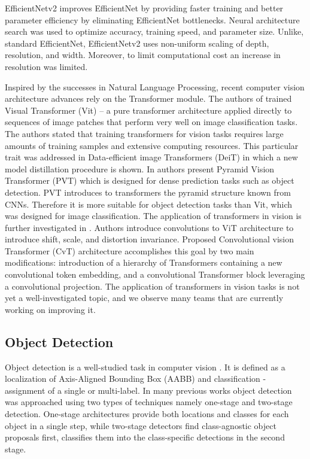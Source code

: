 \documentclass{article}
\begin{document}
EfficientNetv2 \cite{tan2021efficientnetv2} improves EfficientNet by providing faster training and better parameter efficiency by eliminating EfficientNet bottlenecks. Neural architecture search was used to optimize accuracy, training speed, and parameter size. Unlike, standard EfficientNet, EfficientNetv2 uses non-uniform scaling of depth, resolution, and width. Moreover, to limit computational cost an increase in resolution was limited.


Inspired by the successes in Natural Language Processing, recent computer vision architecture advances rely on the Transformer module. The authors of \cite{dosovitskiy2020image} trained Visual Transformer (Vit) --  a pure transformer architecture applied directly to sequences of image patches that perform very well on image classification tasks.
The authors stated that training transformers for vision tasks requires large amounts of training samples and extensive computing resources.
This particular trait was addressed in Data-efficient image Transformers
(DeiT) \cite{touvron2020training} in which a new model distillation procedure is shown.
In \cite{wang2021pyramid} authors present Pyramid Vision Transformer (PVT) which is designed for dense prediction tasks such as object detection.
PVT introduces to transformers the pyramid structure known from CNNs.
Therefore it is more suitable for object detection tasks than Vit, which was designed for image classification.
The application of transformers in vision is further investigated in \cite{wu2021cvt}.
Authors introduce convolutions to ViT architecture to introduce shift, scale,
and distortion invariance.
Proposed Convolutional vision Transformer (CvT) architecture accomplishes this goal by two main modifications: introduction of a hierarchy of Transformers containing a new convolutional token embedding, and a convolutional Transformer
block leveraging a convolutional projection.
The application of transformers in vision tasks is not yet a well-investigated topic, and we observe many teams that are currently working on improving it. 
\subsection{Object Detection}
\label{sec:detection}
Object detection is a well-studied task in computer vision \cite{zou2019object}.
It is defined as a localization of Axis-Aligned Bounding Box (AABB) and classification - assignment of a single or multi-label.
In many previous works object detection was approached using two types of techniques namely one-stage and two-stage detection.
One-stage architectures provide both locations and classes for each object in a single step, while two-stage detectors find class-agnostic object proposals first, classifies them into the class-specific detections in the second stage.
\end{document}
